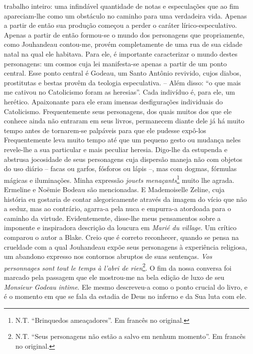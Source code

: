 trabalho inteiro: uma infindável quantidade de notas e especulações que
ao fim apareciam-lhe como um obstáculo no caminho para uma verdadeira
vida. Apenas a partir de então sua produção começou a perder o caráter
lírico-especulativo. Apenas a partir de então formou-se o mundo dos
personagens que propriamente, como Jouhandeau contou-me, provém
completamente de uma rua de sua cidade natal na qual ele habitava. Para
ele, é importante caracterizar o mundo destes personagens: um cosmos
cuja lei manifesta-se apenas a partir de um ponto central. Esse ponto
central é Godeau, um Santo Antônio revivido, cujos diabos, prostitutas e
bestas provêm da teologia especulativa. -- Além disso: ``o que mais me
cativou no Catolicismo foram as heresias''. Cada indivíduo é, para ele,
um herético. Apaixonante para ele eram imensas desfigurações individuais
do Catolicismo. Frequentemente seus personagens, dos quais muitos dos
que ele conhece ainda não entraram em seus livros, permanecem diante
dele já há muito tempo antes de tornarem-se palpáveis para que ele
pudesse expô-los Frequentemente leva muito tempo até que um pequeno
gesto ou mudança neles revele-lhe a sua particular e mais peculiar
heresia. Digo-lhe da estupenda e abstrusa jocosidade de seus personagens
cuja dispersão maneja não com objetos do uso diário -- facas ou garfos,
fósforos ou lápis --, mas com dogmas, fórmulas mágicas e iluminações.
Minha expressão \emph{jouets menaçants}\footnote{N.T. ``Brinquedos
  ameaçadores''. Em francês no original.} muito lhe agrada. Ermeline e
Noëmie Bodeau são mencionadas. E Mademoiselle Zeline, cuja história eu
gostaria de contar alegoricamente através da imagem do vício que não a
seduz, mas ao contrário, agarra-a pela nuca e empurra-a atordoada para o
caminho da virtude. Evidentemente, disse-lhe meus pensamentos sobre a
imponente e inspiradora descrição da loucura em \emph{Marié du village}.
Um crítico comparou o autor a Blake. Creio que é correto reconhecer,
quando se pensa na crueldade com a qual Jouhandeau expõe seus
personagens à experiência religiosa, um abandono expresso nos contornos
abruptos de suas sentenças. \emph{Vos personnages sont tout le temps à
l'abri de rien}\footnote{N.T. ``Seus personagens não estão a salvo em
  nenhum momento''. Em francês no original.}. O fim da nossa conversa
foi marcado pela passagem que ele mostrou-me na bela edição de luxo de
seu \emph{Monsieur Godeau intime}. Ele mesmo descreveu-a como o ponto
crucial do livro, e é o momento em que se fala da estadia de Deus no
inferno e da Sua luta com ele.

